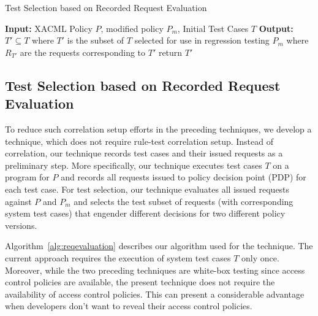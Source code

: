 \begin{algorithmic}
\begin{algorithm}[t]
\caption{\label{alg:reqevaluation}Test Selection based on Recorded Request Evaluation}
\STATE \textbf{Input:} XACML Policy $P$, modified policy $P_{m}$, Initial Test Cases $T$
\STATE \textbf{Output:} $T' \subseteq T$ where $T'$ is the subset of $T$ selected for use in regression testing $P_{m}$
 where $R_{T'}$ are the requests corresponding to $T'$ 
\ENDIF
\ENDFOR
{}
\STATE return $T'$
\end{algorithm}
\end{algorithmic}

\subsection{Test Selection based on Recorded Request Evaluation}
To reduce such correlation setup efforts in the preceding techniques, we develop
a technique, which does not require rule-test correlation setup.
Instead of correlation, our technique records test cases and their issued requests as a preliminary step.
More specifically, our technique executes test cases $T$ on a program for $P$ and records all requests issued to policy decision point (PDP) for each test case. For test selection, our technique evaluates all issued requests against $P$ and $P_m$ and selects the test subset of
requests (with corresponding system test cases) that engender different decisions for two different policy versions.

Algorithm~\ref{alg:reqevaluation} describes our algorithm used for the technique.
The current approach requires the execution of system test cases $T$ only once.
Moreover, while the two preceding techniques are white-box testing since access control policies are available, the present technique 
does not require the availability of access control policies. This can present a considerable advantage when developers don't want 
to reveal their access control policies.


